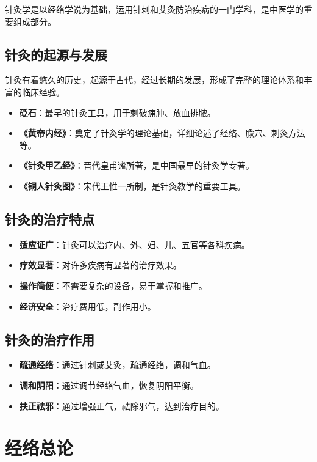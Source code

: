 \documentclass[12pt,UTF8]{ctexbook}
\begin{document}
针灸学是以经络学说为基础，运用针刺和艾灸防治疾病的一门学科，是中医学的重要组成部分。

\subsection{针灸的起源与发展}

针灸有着悠久的历史，起源于古代，经过长期的发展，形成了完整的理论体系和丰富的临床经验。

\begin{itemize}
\item \textbf{砭石}：最早的针灸工具，用于刺破痈肿、放血排脓。
\item \textbf{《黄帝内经》}：奠定了针灸学的理论基础，详细论述了经络、腧穴、刺灸方法等。
\item \textbf{《针灸甲乙经》}：晋代皇甫谧所著，是中国最早的针灸学专著。
\item \textbf{《铜人针灸图》}：宋代王惟一所制，是针灸教学的重要工具。
\end{itemize}

\subsection{针灸的治疗特点}

\begin{itemize}
\item \textbf{适应证广}：针灸可以治疗内、外、妇、儿、五官等各科疾病。
\item \textbf{疗效显著}：对许多疾病有显著的治疗效果。
\item \textbf{操作简便}：不需要复杂的设备，易于掌握和推广。
\item \textbf{经济安全}：治疗费用低，副作用小。
\end{itemize}

\subsection{针灸的治疗作用}

\begin{itemize}
\item \textbf{疏通经络}：通过针刺或艾灸，疏通经络，调和气血。
\item \textbf{调和阴阳}：通过调节经络气血，恢复阴阳平衡。
\item \textbf{扶正祛邪}：通过增强正气，祛除邪气，达到治疗目的。
\end{itemize}

\section{经络总论}
\end{document}
